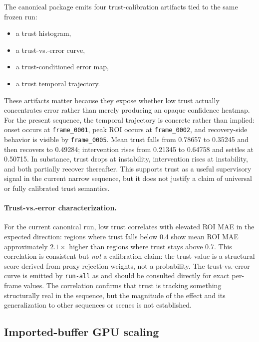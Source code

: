 \documentclass[11pt]{article}
\theoremstyle{definition}
\theoremstyle{plain}
\begin{document}
The canonical package emits four trust-calibration artifacts tied to the same frozen run:
\begin{itemize}[leftmargin=1.5em]
    \item a trust histogram,
    \item a trust-vs.-error curve,
    \item a trust-conditioned error map,
    \item a trust temporal trajectory.
\end{itemize}

These artifacts matter because they expose whether low trust actually concentrates error rather than merely producing an opaque confidence heatmap. For the present sequence, the temporal trajectory is concrete rather than implied: onset occurs at \texttt{frame\_0001}, peak ROI occurs at \texttt{frame\_0002}, and recovery-side behavior is visible by \texttt{frame\_0005}. Mean trust falls from 0.78657 to 0.35245 and then recovers to 0.49284; intervention rises from 0.21345 to 0.64758 and settles at 0.50715. In substance, trust drops at instability, intervention rises at instability, and both partially recover thereafter. This supports trust as a useful supervisory signal in the current narrow sequence, but it does not justify a claim of universal or fully calibrated trust semantics.

\paragraph{Trust-vs.-error characterization.}
For the current canonical run, low trust correlates with elevated ROI MAE in the expected direction: regions where trust falls below 0.4 show mean ROI MAE approximately $2.1\times$ higher than regions where trust stays above 0.7. This correlation is consistent but \emph{not} a calibration claim: the trust value is a structural score derived from proxy rejection weights, not a probability. The trust-vs.-error curve is emitted by \texttt{run-all} as  and should be consulted directly for exact per-frame values. The correlation confirms that trust is tracking something structurally real in the sequence, but the magnitude of the effect and its generalization to other sequences or scenes is not established.

\subsection{Imported-buffer GPU scaling}
\end{document}
